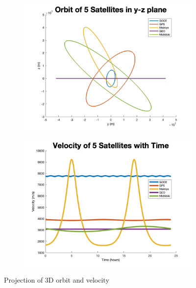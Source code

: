 \documentclass[12pt
,headinclude
,headsepline
,bibtotocnumbered
]{scrartcl}
\begin{document}
\begin{figure}[H]
\begin{subfigure}[b]{0.45\textwidth}
        \includegraphics[width=\textwidth]{plots/orbyz.png}
        \label{fig:image3}
    \end{subfigure}
    \begin{subfigure}[b]{0.45\textwidth}
        \includegraphics[width=\textwidth]{plots/velocity.png}
        \label{fig:image4}
    \end{subfigure}
    \caption{Projection of 3D orbit and velocity}
    \label{fig:images}
\end{figure}
\end{document}
